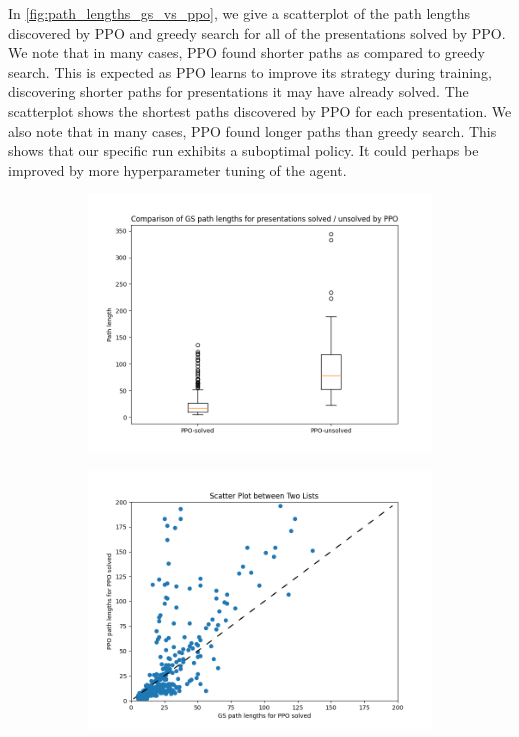 In \autoref{fig:path_lengths_gs_vs_ppo}, we give a scatterplot of the path lengths discovered by PPO and greedy search for all of the presentations solved by PPO. We note that in many cases, PPO found shorter paths as compared to greedy search. This is expected as PPO learns to improve its strategy during training, discovering shorter paths for presentations it may have already solved. The scatterplot shows the shortest paths discovered by PPO for each presentation. We also note that in many cases, PPO found longer paths than greedy search. This shows that our specific run exhibits a suboptimal policy. It could perhaps be improved by more hyperparameter tuning of the agent. 

\begin{figure}
	\centering
	\begin{subfigure}[b]{0.5\textwidth}
		\includegraphics[width=\textwidth]{fig/path_lengths_ppo_solved_vs_unsolved.png}
		\caption{}
		\label{fig:path_lengths_ppo_solved_vs_unsolved}
	\end{subfigure}%
	\begin{subfigure}[b]{0.5\textwidth}
		\centering
		\includegraphics[width=1.1\textwidth]{fig/path_lengths_gs_vs_ppo.png}

\end{subfigure}
\end{figure}
